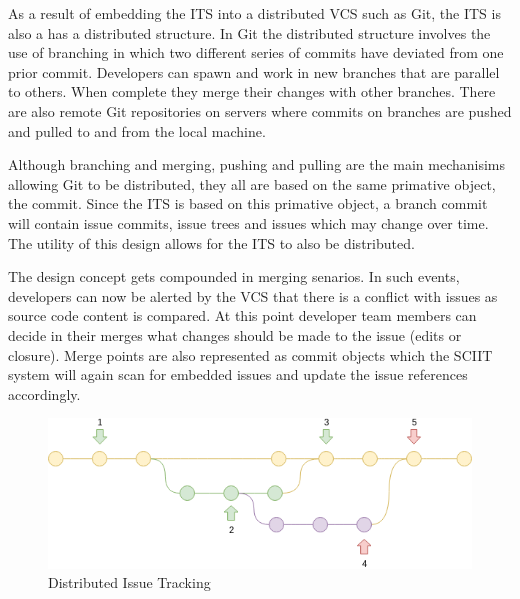 \documentclass{mproj}
\begin{document}
As a result of embedding the ITS into a distributed VCS such as Git, the ITS is also a has a distributed structure. In Git the distributed structure involves the use of branching in which two different series of commits have deviated from one prior commit. Developers can spawn and work in new branches that are parallel to others. When complete they merge their changes with other branches. There are also remote Git repositories on servers where commits on branches are pushed and pulled to and from the local machine. 

Although branching and merging, pushing and pulling are the main mechanisims allowing Git to be distributed, they all are based on the same primative object, the commit. Since the ITS is based on this primative object, a branch commit will contain issue commits, issue trees and issues which may change over time. The utility of this design allows for the ITS to also be distributed.

The design concept gets compounded in merging senarios. In such events, developers can now be alerted by the VCS that there is a conflict with issues as source code content is compared. At this point developer team members can decide in their merges what changes should be made to the issue (edits or closure). Merge points are also represented as commit objects which the SCIIT system will again scan for embedded issues and update the issue references accordingly.

\begin{figure}[t]
\caption{Distributed Issue Tracking}
\label{fig:distributed-issue-tracking}
\centering
\includegraphics[width=15cm]{distributed-issue-tracking}
\end{figure}
\end{document}
